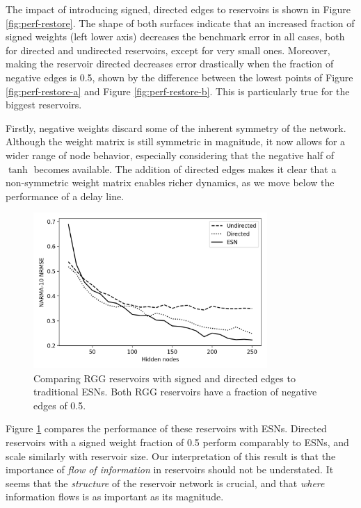 The impact of introducing signed, directed edges to reservoirs is shown in
Figure \ref{fig:perf-restore}. The shape of both surfaces indicate that an
increased fraction of signed weights (left lower axis) decreases the benchmark
error in all cases, both for directed and undirected reservoirs, except for very
small ones. Moreover, making the reservoir directed decreases error drastically
when the fraction of negative edges is 0.5, shown by the difference between the
lowest points of Figure \ref{fig:perf-restore-a} and Figure
\ref{fig:perf-restore-b}. This is particularly true for the biggest reservoirs.

Firstly, negative weights discard some of the inherent symmetry of the
network. Although the weight matrix is still symmetric in magnitude, it now
allows for a wider range of node behavior, especially considering that the
negative half of $\tanh$ becomes available. The addition of directed edges makes
it clear that a non-symmetric weight matrix enables richer dynamics, as we move
below the performance of a delay line.

\begin{figure}[htb]
  \centering
  \includegraphics[width=3.5in]{figures/perf-rest-comp.png}
  \caption{
    Comparing RGG reservoirs with signed and directed edges to traditional
ESNs. Both RGG reservoirs have a fraction of negative edges of 0.5.
  }
  \label{fig:perf-rest-comp}
\end{figure}

Figure \ref{fig:perf-rest-comp} compares the performance of these reservoirs
with ESNs. Directed reservoirs with a signed weight fraction of 0.5 perform
comparably to ESNs, and scale similarly with reservoir size. Our interpretation
of this result is that the importance of \textit{flow of information} in
reservoirs should not be understated. It seems that the \textit{structure} of
the reservoir network is crucial, and that \textit{where} information flows is
as important as its magnitude.

